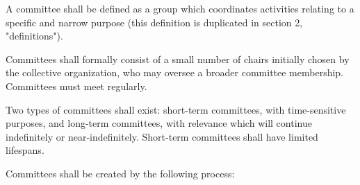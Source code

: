 \documentclass[11pt]{article}
\newcounter{h1}
\newcounter{h2}[h1]
\newcounter{h3}[h2]
\begin{document}


A committee shall be defined as a group which coordinates activities relating to a specific and narrow purpose (this definition is duplicated in section 2, "definitions").

Committees shall formally consist of a small number of chairs initially chosen by the collective organization, who may oversee a broader committee membership. Committees must meet regularly.

Two types of committees shall exist: short-term committees, with time-sensitive purposes, and long-term committees, with relevance which will continue indefinitely or near-indefinitely. Short-term committees shall have limited lifespans.


Committees shall be created by the following process:
\end{document}

